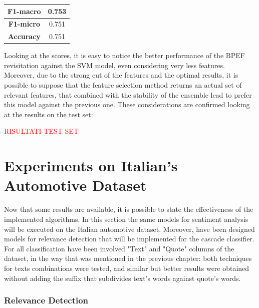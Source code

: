 \begin{center}
	\begin{tabular}{ | c | c | } 
		\hline
		\textbf{F1-macro} & 0.753 \\
		\hline
		\textbf{F1-micro} & 0.751 \\ 
		\hline
		\textbf{Accuracy} & 0.751 \\ 
		\hline
	\end{tabular}
\end{center}

Looking at the scores, it is easy to notice the better performance of the BPEF revisitation against the SVM model, even considering very less features. Moreover, due to the strong cut of the features and the optimal results, it is possible to suppose that the feature selection method returns an actual set of relevant features, that combined with the stability of the ensemble lead to prefer this model against the previous one. These considerations are confirmed looking at the results on the test set:

\textcolor{red}{RISULTATI TEST SET}


\section{Experiments on Italian's Automotive Dataset}

Now that some results are available, it is possible to state the effectiveness of the implemented algorithms. In this section the same models for sentiment analysis will be executed on the Italian automotive dataset. Moreover, have been designed models for relevance detection that will be implemented for the cascade classifier. For all classification have been involved "Text" and "Quote" columns of the dataset, in the way that was mentioned in the previous chapter: both techniques for texts combinations were tested, and similar but better results were obtained without adding the suffix that subdivides text's words against quote's words. \\

\subsubsection{Relevance Detection}

